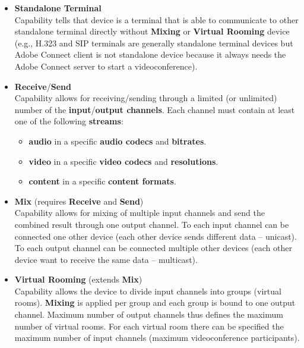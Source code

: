 \documentclass[a4paper]{report}
\begin{document}
\begin{itemize}
\newcommand{\RequireCapability}[1]{(requires #1)}
\newcommand{\ExtendCapability}[1]{(extends #1)}

\item \textbf{Standalone Terminal} \\
  Capability tells that device is a terminal that is able to communicate to
  other standalone terminal directly without \textbf{Mixing} or \textbf{Virtual 
  Rooming} device (e.g., H.323 and SIP terminals are generally standalone 
  terminal devices but Adobe Connect client is not standalone device because it 
  always needs the Adobe Connect server to start a videoconference).
  
\item \textbf{Receive}/\textbf{Send} \\
  Capability allows for receiving/sending through a limited (or unlimited) 
  number of the \textbf{input}/\textbf{output channels}. Each channel must 
  contain at least one of the following \textbf{streams}:
  \begin{itemize}
    \item \textbf{audio} in a specific \textbf{audio codecs} and 
      \textbf{bitrates}.
    \item \textbf{video} in a specific \textbf{video codecs} and 
      \textbf{resolutions}.
    \item \textbf{content} in a specific \textbf{content formats}.
  \end{itemize} 
  
\item \textbf{Mix} \RequireCapability{\textbf{Receive} and \textbf{Send}} \\
  Capability allows for mixing of multiple input channels and send 
  the combined result through one output channel. To each input channel can be connected one other device (each other device sends different data -- unicast). To each output channel can be connected multiple other devices (each other device want to receive the same data -- multicast).

\item \textbf{Virtual Rooming} \ExtendCapability{\textbf{Mix}} \\
  Capability allows the device to divide input channels into groups (virtual 
  rooms). \textbf{Mixing} is applied per group and each group 
  is bound to one output channel. Maximum number of output channels thus 
  defines the maximum number of virtual rooms. For each virtual room there can 
  be specified the maximum number of input channels (maximum videoconference 
  participants).


\end{itemize}
\end{document}
